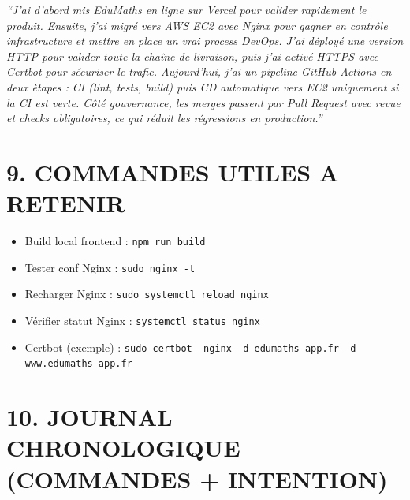 \documentclass[10pt,a4paper]{article}
\begin{document}
\textit{``J'ai d'abord mis EduMaths en ligne sur Vercel pour valider rapidement le produit. Ensuite, j'ai migr\'e vers AWS EC2 avec Nginx pour gagner en contr\^ole infrastructure et mettre en place un vrai process DevOps. J'ai d\'eploy\'e une version HTTP pour valider toute la cha\^ine de livraison, puis j'ai activ\'e HTTPS avec Certbot pour s\'ecuriser le trafic. Aujourd'hui, j'ai un pipeline GitHub Actions en deux \`etapes : CI (lint, tests, build) puis CD automatique vers EC2 uniquement si la CI est verte. C\^ot\'e gouvernance, les merges passent par Pull Request avec revue et checks obligatoires, ce qui r\'eduit les r\'egressions en production.''}

\section{9. COMMANDES UTILES A RETENIR}

\begin{itemize}
  \item Build local frontend : \texttt{npm run build}
  \item Tester conf Nginx : \texttt{sudo nginx -t}
  \item Recharger Nginx : \texttt{sudo systemctl reload nginx}
  \item V\'erifier statut Nginx : \texttt{systemctl status nginx}
  \item Certbot (exemple) : \texttt{sudo certbot --nginx -d edumaths-app.fr -d www.edumaths-app.fr}
\end{itemize}

\section{10. JOURNAL CHRONOLOGIQUE (COMMANDES + INTENTION)}
\end{document}
